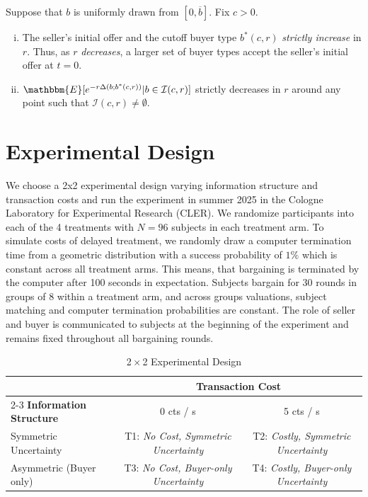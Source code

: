 \begin{proposition}\label{p:uniform_symmetric_cs_r}
Suppose that $b$ is uniformly drawn from $[0,\overline b]$. Fix $c>0$. 
    \begin{enumerate}[(i)]
    \item The seller's initial offer and the cutoff buyer type $b^*(c,r)$ \emph{strictly increase} in $r$. Thus, as $r$ \emph{decreases}, a larger set of buyer types accept the seller's initial offer at $t=0$. 

    \item $\mathbbm{E}[e^{-r\Delta(b;b^*(c,r))}|b\in \mathcal{I}(c,r)]$
    strictly decreases in $r$ around any point such that $\mathcal{I}(c,r)\neq \emptyset$.

    \end{enumerate}
\end{proposition}





\section{Experimental Design}
\label{sec:experimental_design}

We choose a 2x2 experimental design varying information structure and transaction costs and run the experiment in summer 2025 in the Cologne Laboratory for Experimental Research (CLER). We randomize participants into each of the 4 treatments with $N=96$ subjects in each treatment arm. To simulate costs of delayed treatment, we randomly draw a computer termination time from a geometric distribution with a success probability of $1\%$ which is constant across all treatment arms. This means, that bargaining is terminated by the computer after 100 seconds in expectation. Subjects bargain for 30 rounds in groups of 8 within a treatment arm, and across groups valuations, subject matching and computer termination probabilities are constant. The role of seller and buyer is communicated to subjects at the beginning of the experiment and remains fixed throughout all bargaining rounds. 


\begin{table}[htbp]
\centering
\caption{2\,$\times$\,2 Experimental Design}
\begin{tabular}{@{}lcc@{}}
\toprule
 & \multicolumn{2}{c}{\textbf{Transaction Cost}} \\
\cmidrule(lr){2-3}
\textbf{Information Structure} & 0 cts / s & 5 cts / s \\
\midrule
Symmetric Uncertainty & T1: \textit{No Cost, Symmetric Uncertainty} & T2: \textit{Costly, Symmetric Uncertainty} \\
Asymmetric (Buyer only) & T3: \textit{No Cost, Buyer-only Uncertainty} & T4: \textit{Costly, Buyer-only Uncertainty} \\
\bottomrule
\end{tabular}
\label{tab:design}
\end{table}

